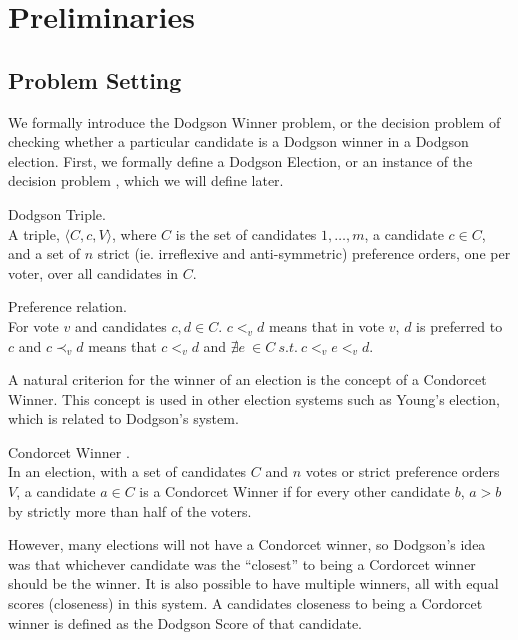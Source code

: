 \section{Preliminaries}

\subsection{Problem Setting}

We formally introduce the Dodgson Winner problem, or the decision problem
of checking whether a particular candidate is a Dodgson winner in a
Dodgson election.
First, we formally define a Dodgson Election, or an instance of the decision
problem \dwin, which we
will define later.

\begin{defn}{Dodgson Triple.}\\
    A triple, $\langle C, c, V \rangle$, where $C$ is the set of candidates
    $1, \dots , m$, a candidate $c \in C$, and a set of $n$ strict
    (ie. irreflexive and anti-symmetric) preference orders,
    one per voter, over all candidates in $C$.
\end{defn}

\begin{defn}{Preference relation.} \\
    For vote $v$ and candidates $c,d \in C$. $c<_{v}d$ means that in vote
$v$, $d$ is preferred to $c$ and $c\prec_v d$ means that $c<_v d$ and
$\nexists e ~ \in C ~ s.t. ~ c <_v e <_v d$.
\end{defn}

A natural criterion for the winner of an election
is the concept of a Condorcet Winner.
This concept is used in other election systems such as Young's election, which
is related to Dodgson's system.

\begin{defn}{Condorcet Winner} \citep{condorcet1785essay}.\\
    In an election, with a set of candidates $C$ and $n$ votes or strict preference
    orders $V$, a candidate $a \in C$ is a Condorcet Winner if for every other
    candidate $b$, $a > b$ by strictly more than half of the voters.
\end{defn}

However, many elections will not have a Condorcet winner, so Dodgson's idea
was that whichever candidate was the ``closest'' to being a Cordorcet winner
should be the winner.
It is also possible to have multiple winners, all with equal scores (closeness)
in this system.
A candidates closeness to being a Cordorcet winner is defined as the Dodgson Score
of that candidate.


